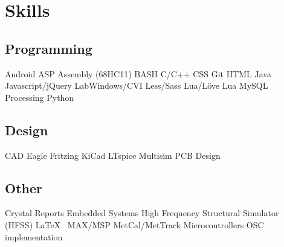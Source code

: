 \documentclass[]{resume-openfont}
\begin{document}
\begin{minipage}[t]{0.34\textwidth}
\section{Skills}
\subsection{Programming}
Android \textbullet{} ASP \textbullet{} Assembly (68HC11) \textbullet{} BASH \textbullet{}  C/C++ \textbullet{} CSS \textbullet{} Git \textbullet{} HTML \textbullet{} Java \textbullet{} Javascript/jQuery \textbullet{} LabWindows/CVI \textbullet{} Less/Sass \textbullet{} Lua/Löve Lua \textbullet{} MySQL \textbullet{} Processing \textbullet{} Python
\sectionsep

\subsection{Design}
CAD \textbullet{} Eagle \textbullet{} Fritzing \textbullet{} KiCad \textbullet{} LTspice \textbullet{} Multisim \textbullet{} PCB Design
\sectionsep

\subsection{Other}
Crystal Reports \textbullet{} Embedded Systems \textbullet{} High Frequency Structural Simulator (HFSS) \textbullet{} \LaTeX\ \textbullet{} MAX/MSP \textbullet{} MetCal/MetTrack \textbullet{} Microcontrollers \textbullet{} OSC implementation
\sectionsep


\end{minipage}
\hfill
\end{document}
